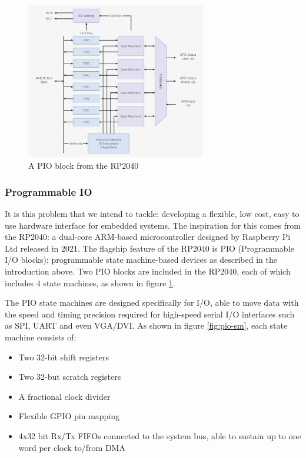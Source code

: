 \documentclass[a4paper,fleqn,12pt]{article}
\begin{document}
\begin{figure}[b!]
	\centering
	\includegraphics[width=0.7\textwidth]{../img/pio-block.jpg}
	\caption{A PIO block from the RP2040 \citep{rp2040}}
	\label{fig:pio-block}
\end{figure}

\subsubsection{Programmable IO}

It is this problem that we intend to tackle: developing a flexible, low cost, easy to use hardware interface for embedded systems. The inspiration for this comes from the RP2040: a dual-core ARM-based microcontroller designed by Raspberry Pi Ltd released in 2021. The flagship feature of the RP2040 is PIO (Programmable I/O blocks): programmable state machine-based devices as described in the introduction above. Two PIO blocks are included in the RP2040, each of which includes 4 state machines, as shown in figure \ref{fig:pio-block}.

The PIO state machines are designed specifically for I/O, able to move data with the speed and timing precision required for high-speed serial I/O interfaces such as SPI, UART and even VGA/DVI. As shown in figure \ref{fig:pio-sm}, each state machine consists of:

\begin{itemize}
	\item Two 32-bit shift registers
	\item Two 32-but scratch registers
	\item A fractional clock divider
	\item Flexible GPIO pin mapping
	\item 4x32 bit Rx/Tx FIFOs connected to the system bus, able to sustain up to one word per clock to/from DMA
\end{itemize}
\end{document}

